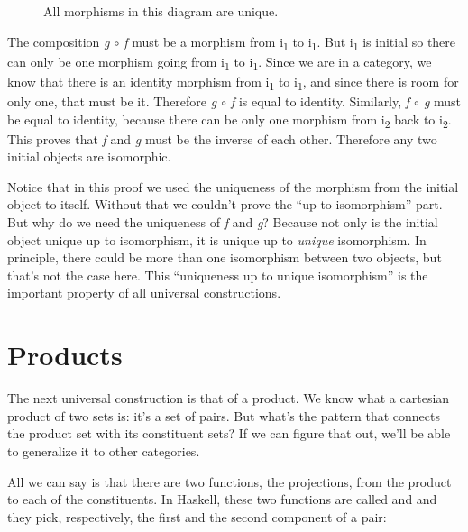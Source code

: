 \begin{figure}[H]
\centering
{}
\caption{All morphisms in this diagram are unique.}
\end{figure}

\noindent
The composition \emph{g \ensuremath{\circ} f} must be a morphism from i\textsubscript{1} to
i\textsubscript{1}. But i\textsubscript{1} is initial so there can only
be one morphism going from i\textsubscript{1} to i\textsubscript{1}.
Since we are in a category, we know that there is an identity morphism
from i\textsubscript{1} to i\textsubscript{1}, and since there is room
for only one, that must be it. Therefore \emph{g \ensuremath{\circ} f} is equal to
identity. Similarly, \emph{f \ensuremath{\circ} g} must be equal to identity, because there
can be only one morphism from i\textsubscript{2} back to
i\textsubscript{2}. This proves that \emph{f} and \emph{g} must be the
inverse of each other. Therefore any two initial objects are isomorphic.

Notice that in this proof we used the uniqueness of the morphism from
the initial object to itself. Without that we couldn't prove the ``up to
isomorphism'' part. But why do we need the uniqueness of \emph{f} and
\emph{g}? Because not only is the initial object unique up to
isomorphism, it is unique up to \emph{unique} isomorphism. In principle,
there could be more than one isomorphism between two objects, but that's
not the case here. This ``uniqueness up to unique isomorphism'' is the
important property of all universal constructions.

\section{Products}\label{products}

The next universal construction is that of a product. We know what a
cartesian product of two sets is: it's a set of pairs. But what's the
pattern that connects the product set with its constituent sets? If we
can figure that out, we'll be able to generalize it to other categories.

All we can say is that there are two functions, the projections, from
the product to each of the constituents. In Haskell, these two functions
are called  and  and they pick, respectively,
the first and the second component of a pair:


